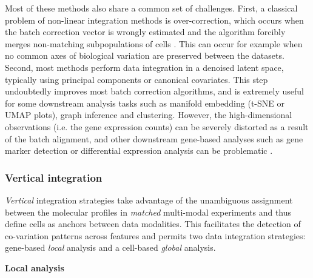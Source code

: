 Most of these methods also share a common set of challenges. First, a classical problem of non-linear integration methods is over-correction, which occurs when the batch correction vector is wrongly estimated and the algorithm forcibly merges non-matching subpopulations of cells \cite{Luecken2020}. This can occur for example when no common axes of biological variation are preserved between the datasets. Second, most methods perform data integration in a denoised latent space, typically using principal components or canonical covariates. This step undoubtedly improves most batch correction algorithms, and is extremely useful for some downstream analysis tasks such as manifold embedding (t-SNE or UMAP plots), graph inference and clustering. However, the high-dimensional observations (i.e. the gene expression counts) can be severely distorted as a result of the batch alignment, and other downstream gene-based analyses such as gene marker detection or differential expression analysis can be problematic \cite{Haghverdi2018}.

\subsubsection{Vertical integration}

\textit{Vertical} integration strategies take advantage of the unambiguous assignment between the molecular profiles in \textit{matched} multi-modal experiments and thus define cells as anchors between data modalities. This facilitates the detection of co-variation patterns across features and permits two data integration strategies: gene-based \textit{local} analysis and a cell-based \textit{global} analysis.

\textbf{Local analysis}

